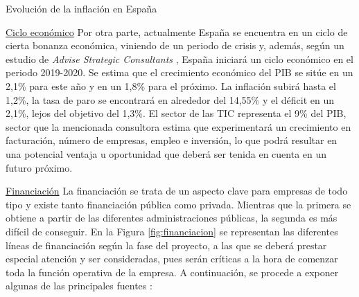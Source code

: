 \begin{table}[!htbp]
	\centering
	{\small
		
	}
	\caption[Evolución de la inflación en España]
	{Evolución de la inflación en España}
	\label{tab:evo_inflacion}
\end{table}

\clearpage

\noindent\underline{Ciclo económico}\newline
\indent Por otra parte, actualmente España se encuentra en un ciclo de cierta bonanza económica, viniendo de un periodo de crisis y, además, según un estudio de \textit{Advise Strategic Consultants} \cite{ituser2019}, España iniciará un ciclo económico en el periodo 2019-2020. Se estima que el crecimiento económico del \acs{PIB} se sitúe en un 2,1\% para este año y en un 1,8\% para el próximo. La inflación subirá hasta el 1,2\%, la tasa de paro se encontrará en alrededor del 14,55\% y el déficit en un 2,1\%, lejos del objetivo del 1,3\%. El sector de las \acf{TIC} representa el 9\% del \acs{PIB}, sector que la mencionada consultora estima que experimentará un crecimiento en facturación, número de empresas, empleo e inversión, lo que podrá resultar en una potencial ventaja u oportunidad que deberá ser tenida en cuenta en un futuro próximo.

\noindent\underline{Financiación}\newline
\indent La financiación se trata de un aspecto clave para empresas de todo tipo y existe tanto financiación pública como privada. Mientras que la primera se obtiene a partir de las diferentes administraciones públicas, la segunda es más difícil de conseguir. En la Figura \ref{fig:financiacion} se representan las diferentes líneas de financiación según la fase del proyecto, a las que se deberá prestar especial atención y ser consideradas, pues serán críticas a la hora de comenzar toda la función operativa de la empresa. A continuación, se procede a exponer algunas de las principales fuentes \cite{javierdonoso2018}:

